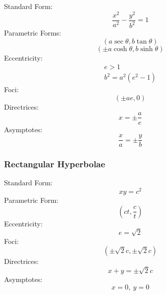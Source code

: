     Standard Form:
    \begin{equation}
        \frac{x^2}{a^2}-\frac{y^2}{b^2}=1
    \end{equation}
    Parametric Forms:
    \begin{equation}
        (a\sec\theta,b\tan\theta)
    \end{equation}
    \begin{equation}
        (\pm a\cosh\theta,b\sinh\theta)
    \end{equation}
    Eccentricity:
    \begin{equation}
        \begin{gathered}
            e>1 \\
            b^2=a^2(e^2-1)
        \end{gathered}
    \end{equation}
    Foci:
    \begin{equation}
        (\pm ae,0)
    \end{equation}
    Directrices:
    \begin{equation}
        x=\pm\frac{a}{e}
    \end{equation}
    Asymptotes:
    \begin{equation}
        \frac{x}{a}=\pm\frac{y}{b}
    \end{equation}

    \subsubsection{Rectangular Hyperbolae}

    Standard Form:
    \begin{equation}
        xy=c^2
    \end{equation}
    Parametric Form:
    \begin{equation}
        \left(ct,\frac{c}{t}\right)
    \end{equation}
    Eccentricity:
    \begin{equation}
        e=\sqrt{2}
    \end{equation}
    Foci:
    \begin{equation}
        (\pm\sqrt{2}c,\pm\sqrt{2}c)
    \end{equation}
    Directrices:
    \begin{equation}
        x+y=\pm\sqrt{2}c
    \end{equation}
    Asymptotes:
    \begin{equation}
        x=0,\ y=0
    \end{equation}

